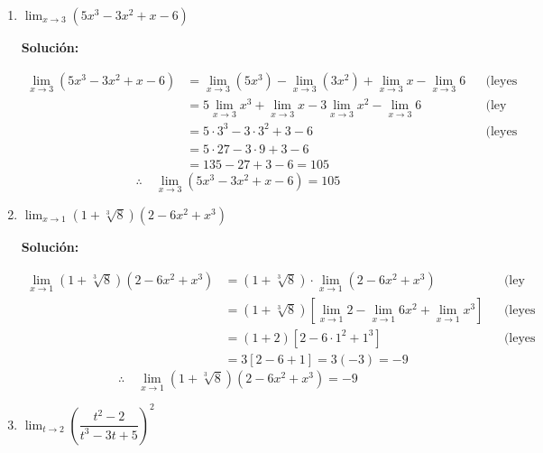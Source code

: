 \documentclass[12pt]{article}
\newcommand{\solucion}{%
    \vspace{0.8em}%
    \textbf{Solución:}%
}
\begin{document}
\begin{enumerate}[label=\alph*)]
    \item $\lim_{x \to 3} (5x^3 - 3x^2 + x - 6)$

    \solucion
    \begin{align*}
        \lim_{x \to 3}(5x^3 - 3x^2 + x - 6)
        &= \lim_{x\to3}(5x^3) - \lim_{x\to3}(3x^2) + \lim_{x\to3}x - \lim_{x\to3}6 && \text{(leyes 1 y 2)}\\
        &= 5\lim_{x\to3}x^3 + \lim_{x\to3}x - 3\lim_{x\to3}x^2 - \lim_{x\to3}6 && \text{(ley 3)}\\
        &= 5\cdot 3^3 - 3\cdot 3^2 + 3 - 6 && \text{(leyes 7, 8 y 9)}\\
        &= 5\cdot 27 - 3\cdot 9 + 3 - 6\\
        &= 135 - 27 +3 - 6 = 105
    \end{align*}
    \[
        \therefore\quad \lim_{x \to 3}(5x^3 - 3x^2 + x - 6) = 105
    \]

    \newpage
    \item $\lim_{x \to 1} (1 + \sqrt[3]{8})(2 - 6x^2 + x^3)$

    \solucion
    \begin{align*}
        \lim_{x \to 1}(1+\sqrt[3]{8})(2-6x^2+x^3)
        &= (1+\sqrt[3]{8}) \cdot \lim_{x\to1}(2-6x^2+x^3) && \text{(ley 3)}\\
        &= (1+\sqrt[3]{8})\left[\lim_{x\to1}2 - \lim_{x\to1}6x^2 + \lim_{x\to1}x^3\right] && \text{(leyes 1 y 2)}\\
        &= (1+2)\left[2 - 6\cdot1^2 + 1^3\right] && \text{(leyes 7, 9 y 10)}\\
        &= 3\left[2 - 6 + 1\right] = 3(-3) = -9
    \end{align*}
    \[
        \therefore\quad \lim_{x\to1}(1+\sqrt[3]{8})(2-6x^2+x^3) = -9
    \]

    \item $\lim_{t \to 2} \left(\dfrac{t^2 - 2}{t^3 - 3t + 5}\right)^2$


\end{enumerate}
\end{document}
